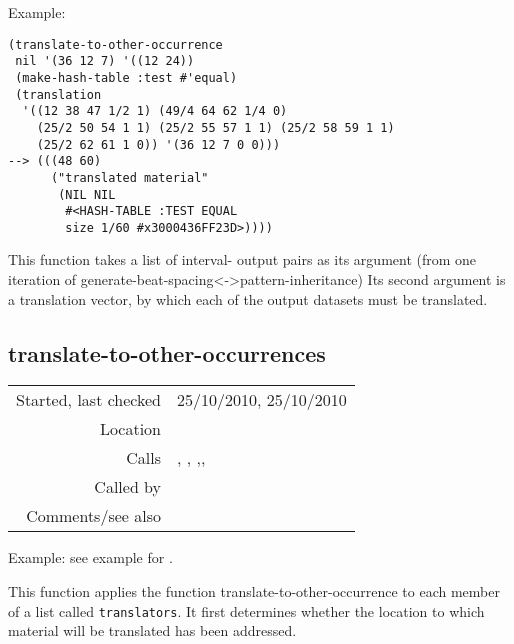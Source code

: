 \vspace{0.5cm}
\noindent Example:
\begin{verbatim}
(translate-to-other-occurrence
 nil '(36 12 7) '((12 24))
 (make-hash-table :test #'equal)
 (translation
  '((12 38 47 1/2 1) (49/4 64 62 1/4 0)
    (25/2 50 54 1 1) (25/2 55 57 1 1) (25/2 58 59 1 1)
    (25/2 62 61 1 0)) '(36 12 7 0 0)))
--> (((48 60)
      ("translated material"
       (NIL NIL
        #<HASH-TABLE :TEST EQUAL
        size 1/60 #x3000436FF23D>))))
\end{verbatim}

\noindent This function takes a list of interval-
output pairs as its argument (from one iteration of
generate-beat-spacing<->pattern-inheritance) Its
second argument is a translation vector, by which
each of the output datasets must be translated.


\subsection*{translate-to-other-occurrences}\label{fun:translate-to-other-occurrences}

\vspace{0.3cm}
\begin{tabular}{r|p{8cm}}
Started, last checked & 25/10/2010, 25/10/2010 \\
Location & \nameref{sec:generating-with-patterns} \\
Calls & \nameref{fun:my-last}, \nameref{fun:nth-list-of-lists}, \nameref{fun:remove-nth},\newline \nameref{fun:subtract-list-from-each-list},\newline \nameref{fun:translate-to-other-occurrence} \\
Called by & \nameref{fun:generate-beat-spacing<->pattern-inheritance} \\
Comments/see also &
\end{tabular}

\vspace{0.5cm}
\noindent Example: see example for
.
\vspace{0.5cm}

\noindent This function applies the function
translate-to-other-occurrence to each member of
a list called \texttt{translators}. It first
determines whether the location to which material will
be translated has been addressed.


















